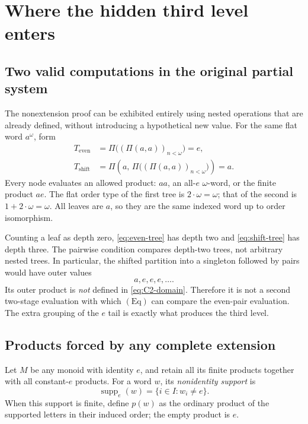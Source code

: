 \documentclass[11pt,letterpaper]{article}
\numberwithin{equation}{section}
\theoremstyle{definition}
\theoremstyle{remark}
\newcommand{\supp}{\operatorname{supp}}
\newcommand{\Eq}{\mathrm{Eq}}
\newcommand{\set}[1]{\{#1\}}
\begin{document}
\section{Where the hidden third level enters}
\label{sec:third}
\subsection{Two valid computations in the original partial system}
The nonextension proof can be exhibited entirely using nested operations that are already defined, without introducing a hypothetical new value. For the same flat word $a^\omega$, form
\begin{align}
T_{\mathrm{even}}&=\Pi\bigl((\Pi(a,a))_{n<\omega}\bigr)=e,\label{eq:even-tree}\\
T_{\mathrm{shift}}&=\Pi\left(a,\,
                  \Pi\bigl((\Pi(a,a))_{n<\omega}\bigr)\right)=a.
                  \label{eq:shift-tree}
\end{align}
Every node evaluates an allowed product: $aa$, an all-$e$ $\omega$-word, or the finite product $ae$. The flat order type of the first tree is $2\cdot\omega=\omega$; that of the second is $1+2\cdot\omega=\omega$. All leaves are $a$, so they are the same indexed word up to order isomorphism.

Counting a leaf as depth zero, \eqref{eq:even-tree} has depth two and \eqref{eq:shift-tree} has depth three. The pairwise condition compares depth-two trees, not arbitrary nested trees. In particular, the shifted partition into a singleton followed by pairs would have outer values
\[
a,e,e,e,\ldots.
\]
Its outer product is \emph{not} defined in \eqref{eq:C2-domain}. Therefore it is not a second two-stage evaluation with which $(\Eq)$ can compare the even-pair evaluation. The extra grouping of the $e$ tail is exactly what produces the third level.

\subsection{Products forced by any complete extension}
Let $M$ be any monoid with identity $e$, and retain all its finite products together with all constant-$e$ products. For a word $w$, its \emph{nonidentity support} is
\[
\supp_e(w)=\set{i\in I:w_i\ne e}.
\]
When this support is finite, define $p(w)$ as the ordinary product of the supported letters in their induced order; the empty product is $e$.
\end{document}
